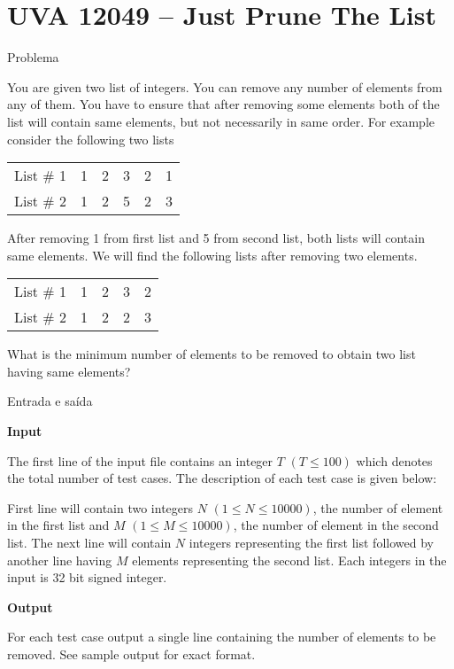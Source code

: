 \section{UVA 12049 -- Just Prune The List}

\begin{frame}[fragile]{Problema}

You are given two list of integers. You can remove any number of elements from any of them. You
have to ensure that after removing some elements both of the list will contain same elements, but not
necessarily in same order. For example consider the following two lists
\begin{table}[h]
    \centering
    \begin{tabular}{|l|ccccc|}
    \hline
    List \# 1 & 1 & 2 & 3 & 2 & 1 \\
    List \# 2 & 1 & 2 & 5 & 2 & 3 \\
    \hline
    \end{tabular}
\end{table}

After removing 1 from first list and 5 from second list, both lists will contain same elements. We
will find the following lists after removing two elements.
\begin{table}[h]
    \centering
    \begin{tabular}{|l|cccc|}
    \hline
    List \# 1 & 1 & 2 & 3 & 2 \\
    List \# 2 & 1 & 2 & 2 & 3 \\
    \hline
    \end{tabular}
\end{table}

What is the minimum number of elements to be removed to obtain two list having same elements?
\end{frame}

\begin{frame}[fragile]{Entrada e saída}

\textbf{Input}

The first line of the input file contains an integer $T$ $(T\leq 100)$ which denotes the total 
number of test cases. The description of each test case is given below:

First line will contain two integers $N$ $(1 \leq N \leq 10000)$, the number of element in the 
first list and $M$ $(1\leq M\leq 10000)$, the number of element in the second list. The next line 
will contain $N$ integers
representing the first list followed by another line having $M$ elements representing the second list. Each integers in the input is 32 bit signed integer.

\textbf{Output}

For each test case output a single line containing the number of elements to be removed. See sample
output for exact format.
\end{frame}


